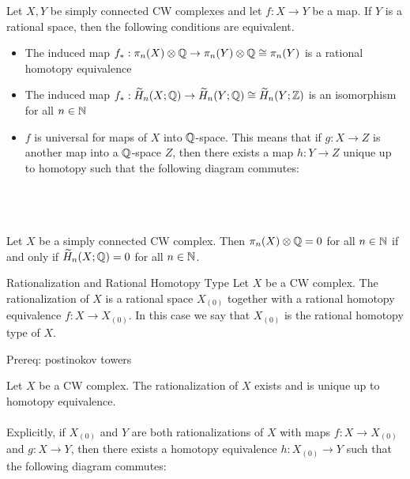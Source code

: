 \documentclass[a4paper]{article}
\begin{document}
\begin{thm}{}{} Let $X,Y$ be simply connected CW complexes and let $f:X\to Y$ be a map. If $Y$ is a rational space, then the following conditions are equivalent. 
\begin{itemize}
\item The induced map $f_\ast:\pi_n(X)\otimes\mathbb{Q}\to\pi_n(Y)\otimes\mathbb{Q}\cong\pi_n(Y)$ is a rational homotopy equivalence
\item The induced map $f_\ast:\widetilde{H}_n(X;\mathbb{Q})\to\widetilde{H}_n(Y;\mathbb{Q})\cong\widetilde{H}_n(Y;\mathbb{Z})$ is an isomorphism for all $n\in\mathbb{N}$
\item $f$ is universal for maps of $X$ into $\mathbb{Q}$-space. This means that if $g:X\to Z$ is another map into a $\mathbb{Q}$-space $Z$, then there exists a map $h:Y\to Z$ unique up to homotopy such that the following diagram commutes: \\~\\
\\~\\
\end{itemize}
\end{thm}

\begin{lmm}{}{} Let $X$ be a simply connected CW complex. Then $\pi_n(X)\otimes\mathbb{Q}=0$ for all $n\in\mathbb{N}$ if and only if $\widetilde{H}_n(X;\mathbb{Q})=0$ for all $n\in\mathbb{N}$. 
\end{lmm}

\begin{defn}{Rationalization and Rational Homotopy Type}{} Let $X$ be a CW complex. The rationalization of $X$ is a rational space $X_{(0)}$ together with a rational homotopy equivalence $f:X\to X_{(0)}$. In this case we say that $X_{(0)}$ is the rational homotopy type of $X$. 
\end{defn}

Prereq: postinokov towers

\begin{thm}{}{} Let $X$ be a CW complex. The rationalization of $X$ exists and is unique up to homotopy equivalence. \\~\\

Explicitly, if $X_{(0)}$ and $Y$ are both rationalizations of $X$ with maps $f:X\to X_{(0)}$ and $g:X\to Y$, then there exists a homotopy equivalence $h:X_{(0)}\to Y$ such that the following diagram commutes: \\~\\
\\~\\
\end{thm}
\end{document}
